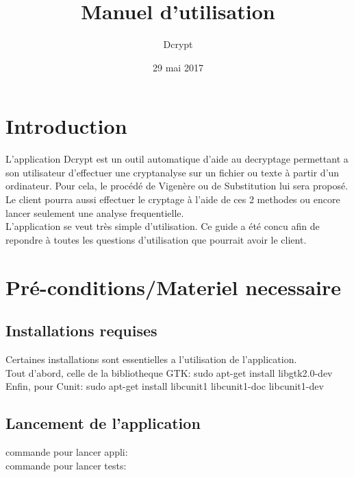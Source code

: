 \documentclass[a4]{article}
\begin{document}
	\title{\Huge{\textbf{Manuel d'utilisation}}}
	\author{Dcrypt}
	\date{29 mai 2017}
		

	\begin{titlepage}
		\maketitle
		\vspace{20em}
	\end{titlepage}
	\section{Introduction}
L'application Dcrypt est un outil automatique d'aide au decryptage permettant a son utilisateur d'effectuer une cryptanalyse
sur un fichier ou texte à partir d'un ordinateur. Pour cela, le procédé de Vigenère ou de Substitution lui sera proposé. \\
Le client pourra aussi effectuer le cryptage à l'aide de ces 2 methodes ou encore lancer seulement une analyse frequentielle. \\
L’application se veut très simple d’utilisation. Ce guide a été concu afin de repondre à toutes les questions d'utilisation que
pourrait avoir le client.


	\section{Pré-conditions/Materiel necessaire}

		\subsection{Installations requises}
			Certaines installations sont essentielles a l'utilisation de l'application.\\
			Tout d'abord, celle de la bibliotheque GTK: sudo apt-get install libgtk2.0-dev \\
			Enfin, pour Cunit:  sudo apt-get install libcunit1 libcunit1-doc libcunit1-dev \\

		\subsection{Lancement de l'application}
			commande pour lancer appli:\\
			commande pour lancer tests:\\
\end{document}

